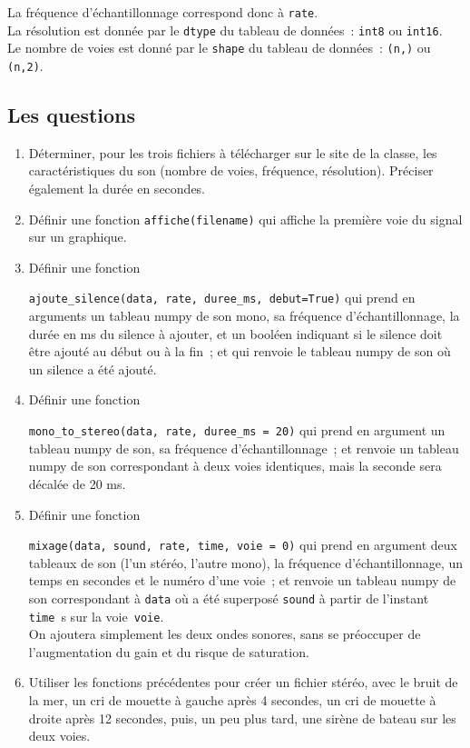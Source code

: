 \documentclass[10pt,fleqn]{article} %
\begin{document}
\begin{multicols}{2}
La fréquence d'échantillonnage correspond donc à \verb#rate#.\\
La
résolution est donnée par le \verb#dtype# du tableau de données~: 
\verb#int8# ou \verb#int16#. \\
Le
nombre de voies est donné par le \verb#shape# du tableau de données~:
\verb#(n,)# ou \verb#(n,2)#. 


\subsection*{Les questions}

\begin{enumerate}[resume*]
\item 
  Déterminer, pour les trois fichiers à télécharger sur le site de la
  classe, les caractéristiques du son (nombre de voies, fréquence,
  résolution). Préciser également la durée en secondes.  
\item 
  Définir une fonction \verb#affiche(filename)# qui affiche la
  première voie du signal sur un graphique. 
\item 
  Définir une fonction
  
  \verb#ajoute_silence(data, rate, duree_ms, debut=True)# 
  qui prend en arguments un tableau numpy de son mono, sa fréquence
  d'échantillonnage, la durée en ms du silence à ajouter, et un
  booléen indiquant si le silence doit être ajouté au début ou à la
  fin~; et qui renvoie le tableau numpy de son où un silence a été
  ajouté. 
\item 
  Définir une fonction
  
  \verb#mono_to_stereo(data, rate, duree_ms = 20)#
  qui prend en argument un tableau numpy de son, sa fréquence
  d'échantillonnage~; et renvoie un tableau numpy de son correspondant
  à deux voies identiques, mais la seconde sera décalée de 20 ms.
\item 
  Définir une fonction
  
  \verb#mixage(data, sound, rate, time, voie = 0)#
  qui prend en argument deux tableaux de son (l'un stéréo, l'autre
  mono), 
  la fréquence d'échantillonnage, un temps en secondes et le numéro
  d'une voie~; et renvoie un tableau numpy de son
  correspondant à \verb#data# où a été superposé \verb#sound# à partir
  de l'instant \verb#time#~s sur la voie~\verb#voie#. \\
  On ajoutera simplement les deux ondes sonores, sans se préoccuper de
  l'augmentation du gain et du risque de saturation. 
\item 
  Utiliser les fonctions précédentes pour créer un fichier stéréo,
  avec le bruit de la mer, un cri de mouette à gauche après 4
  secondes, un cri de mouette à droite après 12 secondes, puis, un peu
  plus tard, une sirène de bateau sur les deux voies. 


\end{enumerate}
\end{multicols}
\end{document}
